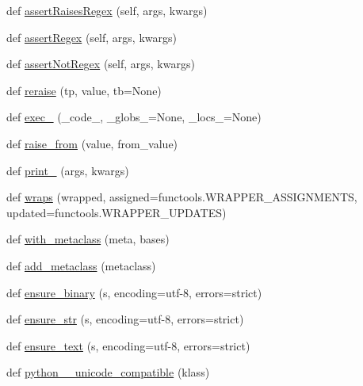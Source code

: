 \begin{DoxyCompactItemize}
\item 
def \hyperlink{namespacepip_1_1__vendor_1_1six_aed2ef59a1cb8d0e0ea58524e43b42f48}{assert\+Raises\+Regex} (self, args, kwargs)
\item 
def \hyperlink{namespacepip_1_1__vendor_1_1six_a4f4e365e8108b1e5f61eac239d86b796}{assert\+Regex} (self, args, kwargs)
\item 
def \hyperlink{namespacepip_1_1__vendor_1_1six_acf6fa0d86b738851f221ad65791b7d36}{assert\+Not\+Regex} (self, args, kwargs)
\item 
def \hyperlink{namespacepip_1_1__vendor_1_1six_af6a8c78d8b7789637b979d7a92a40946}{reraise} (tp, value, tb=None)
\item 
def \hyperlink{namespacepip_1_1__vendor_1_1six_a8d59a77fbe8c8bcb280d056ccfd07dab}{exec\+\_\+} (\+\_\+code\+\_\+, \+\_\+globs\+\_\+=None, \+\_\+locs\+\_\+=None)
\item 
def \hyperlink{namespacepip_1_1__vendor_1_1six_a5c5ed849179e1ac2761bdc10b2aa1706}{raise\+\_\+from} (value, from\+\_\+value)
\item 
def \hyperlink{namespacepip_1_1__vendor_1_1six_aec57b90390e2de2103dc7fae7bfbea76}{print\+\_\+} (args, kwargs)
\item 
def \hyperlink{namespacepip_1_1__vendor_1_1six_a173274a498f02f13e419b728879d07d6}{wraps} (wrapped, assigned=functools.\+W\+R\+A\+P\+P\+E\+R\+\_\+\+A\+S\+S\+I\+G\+N\+M\+E\+N\+TS, updated=functools.\+W\+R\+A\+P\+P\+E\+R\+\_\+\+U\+P\+D\+A\+T\+ES)
\item 
def \hyperlink{namespacepip_1_1__vendor_1_1six_a14b7cf798c1c133414050a65faa225a0}{with\+\_\+metaclass} (meta, bases)
\item 
def \hyperlink{namespacepip_1_1__vendor_1_1six_a454866fb475fc212884e6d6c05a54792}{add\+\_\+metaclass} (metaclass)
\item 
def \hyperlink{namespacepip_1_1__vendor_1_1six_a319fd5a3c0d49137138153dc3a9cda82}{ensure\+\_\+binary} (s, encoding=\textquotesingle{}utf-\/8\textquotesingle{}, errors=\textquotesingle{}strict\textquotesingle{})
\item 
def \hyperlink{namespacepip_1_1__vendor_1_1six_a494d3bb38ecf30f9b4a6ccc59d67bc30}{ensure\+\_\+str} (s, encoding=\textquotesingle{}utf-\/8\textquotesingle{}, errors=\textquotesingle{}strict\textquotesingle{})
\item 
def \hyperlink{namespacepip_1_1__vendor_1_1six_a876d78ba61942e076dbc2c335c180f1c}{ensure\+\_\+text} (s, encoding=\textquotesingle{}utf-\/8\textquotesingle{}, errors=\textquotesingle{}strict\textquotesingle{})
\item 
def \hyperlink{namespacepip_1_1__vendor_1_1six_a73067039b6330b5c45e695487a314c41}{python\+\_\+\_\+unicode\+\_\+compatible} (klass)
\end{DoxyCompactItemize}
